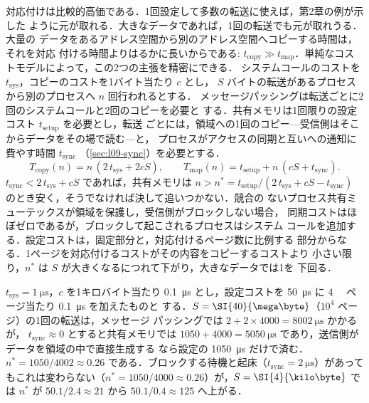 \documentclass[../main.tex]{subfiles}
\begin{document}
対応付けは比較的高価である．1回設定して多数の転送に使えば，第2章の例が示した
ように元が取れる．大きなデータであれば，1回の転送でも元が取れうる．大量の
データをあるアドレス空間から別のアドレス空間へコピーする時間は，それを対応
付ける時間よりはるかに長いからである: $t_{\mathrm{copy}} \gg
t_{\mathrm{map}}$．単純なコストモデルによって，この2つの主張を精密にできる．
システムコールのコストを $t_{\mathrm{sys}}$，コピーのコストを1バイト当たり $c$
とし，
$S$ バイトの転送があるプロセスから別のプロセスへ $n$ 回行われるとする．
メッセージパッシングは転送ごとに2回のシステムコールと2回のコピーを必要と
する．共有メモリは1回限りの設定コスト $t_{\mathrm{setup}}$ を必要とし，転送
ごとには，領域への1回のコピー---受信側はそこからデータをその場で読む---と，
プロセスがアクセスの同期と互いへの通知に費やす時間 $t_{\mathrm{sync}}$
（\cref{sec:l09-sync}）を必要とする．
\begin{equation}
  T_{\mathrm{copy}}(n) = n\,(2\,t_{\mathrm{sys}} + 2cS) ,
  \qquad
  T_{\mathrm{map}}(n) = t_{\mathrm{setup}} + n\,(cS + t_{\mathrm{sync}}) .
  \label{eq:l09-copy-map}
\end{equation}
$t_{\mathrm{sync}} < 2\,t_{\mathrm{sys}} + cS$ であれば，共有メモリは
$n > n^{*} = t_{\mathrm{setup}} / (2\,t_{\mathrm{sys}} + cS -
t_{\mathrm{sync}})$ のとき安く，そうでなければ決して追いつかない．競合の
ないプロセス共有ミューテックスが領域を保護し，受信側がブロックしない場合，
同期コストはほぼゼロであるが，ブロックして起こされるプロセスはシステム
コールを追加する．設定コストは，固定部分と，対応付けるページ数に比例する
部分からなる．1ページを対応付けるコストがその内容をコピーするコストより
小さい限り，$n^{*}$ は $S$ が大きくなるにつれて下がり，大きなデータでは1を
下回る．

\begin{example}
  \label{ex:l09-copy-map}
  $t_{\mathrm{sys}} = \SI{1}{\micro\second}$，$c$ を1キロバイト当たり
  \SI{0.1}{\micro\second} とし，設定コストを \SI{50}{\micro\second} に
  \SI{4}{\kilo\byte} ページ当たり \SI{0.1}{\micro\second} を加えたものと
  する．$S = \SI{40}{\mega\byte}$（$10^4$ ページ）の1回の転送は，メッセージ
  パッシングでは $2 + 2 \times 4000 = \SI{8002}{\micro\second}$ かかるが，
  $t_{\mathrm{sync}} \approx 0$ とすると共有メモリでは $1050 + 4000 =
  \SI{5050}{\micro\second}$ であり，送信側がデータを領域の中で直接生成する
  なら設定の \SI{1050}{\micro\second} だけで済む．$n^{*} = 1050/4002 \approx
  0.26$ である．ブロックする待機と起床（$t_{\mathrm{sync}} =
  \SI{2}{\micro\second}$）があってもこれは変わらない（$n^{*} = 1050/4000
  \approx 0.26$）が，$S = \SI{4}{\kilo\byte}$ では $n^{*}$ が $50.1/2.4
  \approx 21$ から $50.1/0.4 \approx 125$ へ上がる．
\end{example}
\end{document}
